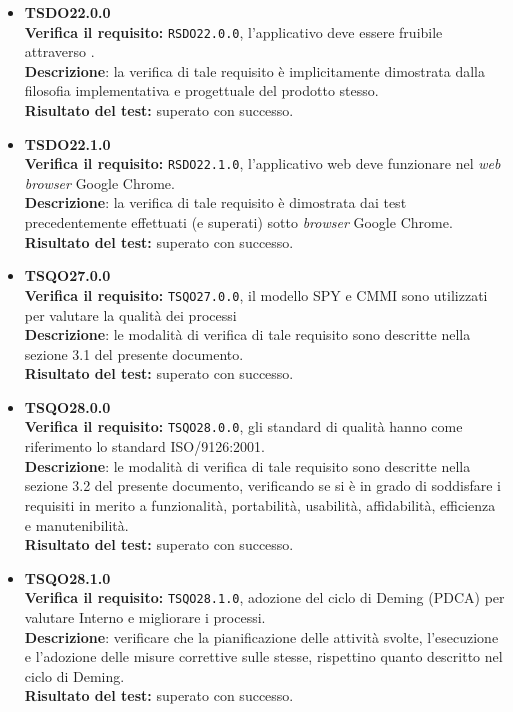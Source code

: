 \begin{itemize}
\item \textbf{TSDO22.0.0}\\
\textbf{Verifica il requisito:} \texttt{RSDO22.0.0}, l'applicativo deve essere fruibile attraverso .\\
\textbf{Descrizione}: la verifica di tale requisito è implicitamente dimostrata dalla filosofia implementativa e progettuale del prodotto stesso.\\
\textbf{Risultato del test:} superato con successo.

\item \textbf{TSDO22.1.0}\\
\textbf{Verifica il requisito:} \texttt{RSDO22.1.0}, l'applicativo web deve funzionare nel \textit{web browser} Google Chrome.\\
\textbf{Descrizione}: la verifica di tale requisito è dimostrata dai test precedentemente effettuati (e superati) sotto \textit{browser} Google Chrome.
\textbf{Risultato del test:} superato con successo.

\item \textbf{TSQO27.0.0}\\
\textbf{Verifica il requisito:} \texttt{TSQO27.0.0}, il modello SPY e CMMI sono utilizzati per valutare la qualità dei processi\\
\textbf{Descrizione}: le modalità di verifica di tale requisito sono descritte nella sezione 3.1 del presente documento.\\
\textbf{Risultato del test:} superato con successo.

\item \textbf{TSQO28.0.0}\\
\textbf{Verifica il requisito:} \texttt{TSQO28.0.0}, gli standard di qualità hanno come riferimento lo standard ISO/9126:2001.\\
\textbf{Descrizione}: le modalità di verifica di tale requisito sono descritte nella sezione 3.2 del presente documento, verificando se si è in grado di soddisfare i requisiti in merito a funzionalità, portabilità, usabilità, affidabilità, efficienza e manutenibilità.\\
\textbf{Risultato del test:} superato con successo.

\item \textbf{TSQO28.1.0}\\
\textbf{Verifica il requisito:} \texttt{TSQO28.1.0}, adozione del ciclo di Deming (PDCA) per valutare Interno e migliorare i processi.\\
\textbf{Descrizione}: verificare che la pianificazione delle attività svolte, l'esecuzione e l'adozione delle misure correttive sulle stesse, rispettino quanto descritto nel ciclo di Deming.\\
\textbf{Risultato del test:} superato con successo.


\end{itemize}
